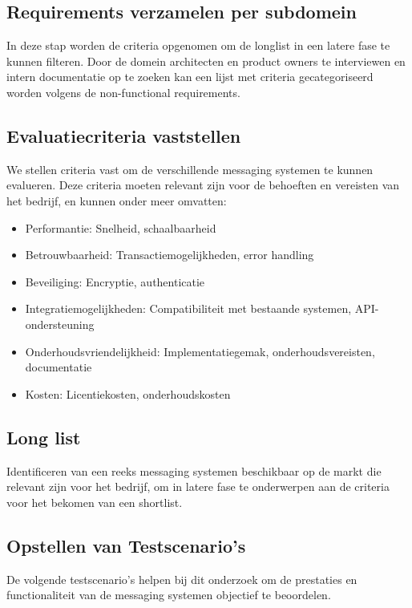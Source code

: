  
\subsection{Requirements verzamelen per \newline subdomein}
In deze stap worden de criteria opgenomen om de longlist in een latere fase te kunnen filteren.
Door de domein architecten en product owners te interviewen en intern documentatie op te zoeken kan een 
lijst met criteria gecategoriseerd worden volgens de non-functional requirements.

\subsection{Evaluatiecriteria vaststellen}
We stellen criteria vast om de verschillende messaging systemen te kunnen evalueren. 
Deze criteria moeten relevant zijn voor de behoeften en vereisten van het bedrijf, en kunnen onder meer omvatten:
\begin{itemize}
  \item Performantie: Snelheid, schaalbaarheid
  \item Betrouwbaarheid: Transactiemogelijkheden, error handling
  \item Beveiliging: Encryptie, authenticatie
  \item Integratiemogelijkheden: Compatibiliteit \newline met bestaande systemen, API-ondersteuning
  \item Onderhoudsvriendelijkheid: Implementatiegemak, onderhoudsvereisten, documentatie
  \item Kosten: Licentiekosten, onderhoudskosten
\end{itemize}

\subsection{Long list}
Identificeren van een reeks messaging systemen beschikbaar op de markt die relevant zijn voor het bedrijf, 
om in latere fase te onderwerpen aan de criteria voor het bekomen van een shortlist.

\subsection{Opstellen van Testscenario's}
De volgende testscenario's helpen bij dit onderzoek om de prestaties en functionaliteit van de messaging systemen 
objectief te beoordelen.


